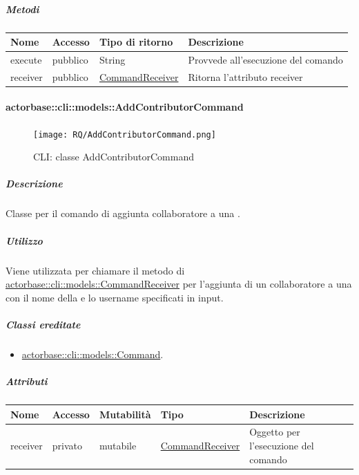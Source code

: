 \documentclass{scalatekids-article}
\begin{document}
\subparagraph{Metodi}

\begin{tabular}{| l | l | l | l |}
  \hline
  Nome & Accesso & Tipo di ritorno & Descrizione\\
  \hline
  execute & pubblico & String & Provvede all'esecuzione del comando\\
  \hline
  receiver & pubblico & \hyperref[sec:actorbase::cli::models::CommandReceiver]{CommandReceiver} & Ritorna l'attributo receiver\\
  \hline
\end{tabular}

\paragraph{actorbase::cli::models::AddContributorCommand}
\label{sec:actorbase::cli::models::AddContributorCommand}

\begin{figure}[H]
  \begin{center}
    \texttt{[image: RQ/AddContributorCommand.png]}
    \caption{CLI: classe AddContributorCommand}
  \end{center}
\end{figure}

\subparagraph{Descrizione}

Classe per il comando di aggiunta collaboratore a una .

\subparagraph{Utilizzo}

Viene utilizzata per chiamare il metodo di
\hyperref[sec:actorbase::cli::models::CommandReceiver]{actorbase::cli::models::CommandReceiver} per l'aggiunta di un collaboratore a
una  con il nome della  e lo username specificati
in input.

\subparagraph{Classi ereditate}

\begin{itemize}
\item \hyperref[sec:actorbase::cli::models::Command]{actorbase::cli::models::Command}.
\end{itemize}

\subparagraph{Attributi}

\begin{tabular}{| p{1cm} | p{1.5cm} | p{2cm} | p{4cm} | p{8.5cm} |}
  \hline
  Nome & Accesso & Mutabilità & Tipo & Descrizione\\
  \hline
  receiver & privato & mutabile & \hyperref[sec:actorbase::cli::models::CommandReceiver]{CommandReceiver} & Oggetto per l'esecuzione del comando\\
  \hline
\end{tabular}
\end{document}
